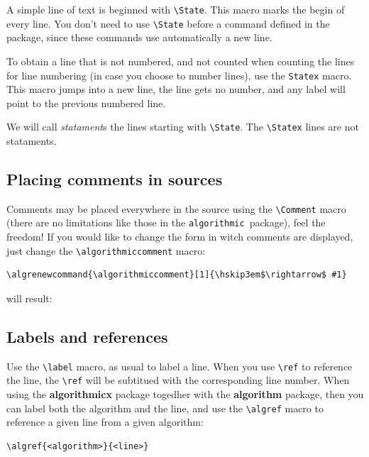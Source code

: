 \documentclass{article}
\newcommand{\old}{\texttt{algorithmic}}
\begin{document}
A simple line of text is beginned with \verb:\State:. This macro marks the begin of every 
line. You don't need to use \verb:\State: before a command defined in the package, since 
these commands use automatically a new line.

To obtain a line that is not numbered, and not counted when counting the lines for line numbering
(in case you choose to number lines), use the \verb:Statex: macro. This macro jumps into a new line, 
the line gets no number, and any label will point to the previous numbered line.

We will call \textit{statament\/}s the lines starting with \verb:\State:. The \verb:\Statex: 
lines are not stataments.

\subsection{Placing comments in sources}\label{Putting comments in sources}

Comments may be placed everywhere in the source using the \verb:\Comment: macro 
(there are no limitations like those in the \old\ package), feel the freedom!
If you would like to change the form in witch comments are displayed, just 
change the \verb:\algorithmiccomment: macro:

\begin{verbatim}
\algrenewcommand{\algorithmiccomment}[1]{\hskip3em$\rightarrow$ #1}
\end{verbatim}

will result:
\medskip
{}

\subsection{Labels and references}
Use the \verb:\label: macro, as usual to label a line. When you use \verb:\ref: to reference 
the line, the \verb:\ref: will be subtitued with the corresponding line number. When using the 
\textbf{algorithmicx} package togedher with the \textbf{algorithm} package, then you can label 
both the algorithm and the line, and use the \verb:\algref: macro to reference a given line 
from a given algorithm:

\begin{verbatim}
\algref{<algorithm>}{<line>}
\end{verbatim}
\end{document}
